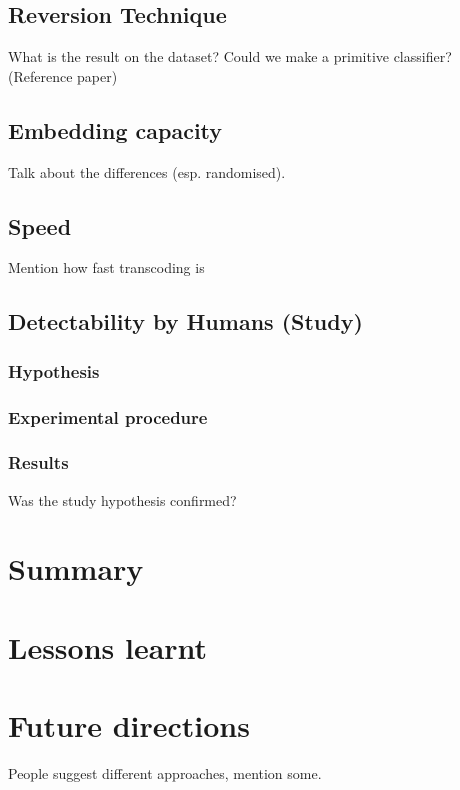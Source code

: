\documentclass[12pt,british,twoside,notitlepage,usenames,dvipsnames,hypens,final]{report}
\numberwithin{equation}{section}
\numberwithin{figure}{section}
\begin{document}
\subsection{Reversion Technique}

What is the result on the dataset? Could we make a primitive classifier? (Reference paper)

\subsection{Embedding capacity}

Talk about the differences (esp. randomised).

\subsection{Speed}

Mention how fast transcoding is

\subsection{Detectability by Humans (Study)}

\subsubsection{Hypothesis}

\subsubsection{Experimental procedure}

\subsubsection{Results}

Was the study hypothesis confirmed?


\section{Summary}

\section{Lessons learnt}

\section{Future directions}

People suggest different approaches, mention some.

\cleardoublepage


\end{document}
